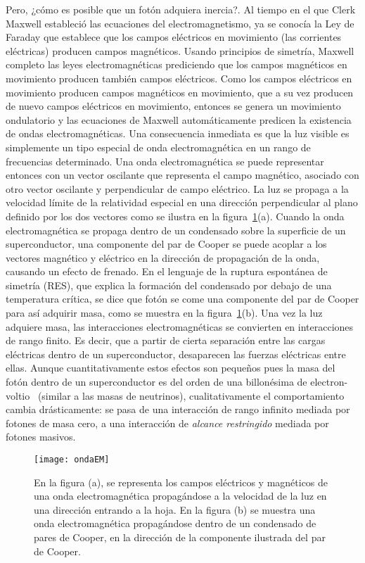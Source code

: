 Pero, ¿cómo es posible que un fotón adquiera inercia?. Al tiempo en el que Clerk Maxwell estableció las ecuaciones del electromagnetismo, ya se conocía la Ley de Faraday que establece que los campos eléctricos en movimiento (las corrientes eléctricas) producen campos magnéticos. Usando principios de simetría, Maxwell completo las leyes electromagnéticas prediciendo que los campos magnéticos en movimiento producen también campos eléctricos. Como los campos eléctricos en movimiento producen campos magnéticos en movimiento, que a su vez producen de nuevo campos eléctricos en movimiento, entonces se genera un movimiento ondulatorio y las ecuaciones de Maxwell automáticamente predicen la existencia de ondas electromagnéticas. Una consecuencia inmediata es que la luz visible es simplemente un tipo especial de onda electromagnética en un rango de frecuencias determinado. Una onda electromagnética se puede representar entonces con un vector oscilante que representa el campo magnético, asociado con otro vector oscilante y perpendicular de campo eléctrico. La luz se propaga a la velocidad límite de la relatividad especial en una dirección perpendicular al plano definido por los dos vectores como se ilustra en la figura~\ref{fig:2}(a). Cuando la onda electromagnética se propaga dentro de un condensado sobre la superficie de un superconductor, una componente del par de Cooper se puede acoplar a los vectores magnético y eléctrico en la dirección de propagación de la onda, causando un efecto de frenado. En el lenguaje de la ruptura espontánea de simetría (RES), que explica la formación del condensado por debajo de una temperatura crítica, se dice que fotón se come una componente del par de Cooper para así adquirir masa, como se muestra en la figura~\ref{fig:2}(b). Una vez la luz adquiere masa, las interacciones electromagnéticas se convierten en interacciones de rango finito. Es decir, que a partir de cierta separación entre las cargas eléctricas dentro de un superconductor, desaparecen las fuerzas eléctricas entre ellas. Aunque cuantitativamente estos efectos son pequeños pues la masa del fotón dentro de un superconductor es del orden de una billonésima de electron-voltio~\cite{beamline} (similar a las masas de neutrinos), cualitativamente el comportamiento cambia drásticamente: se pasa de una interacción de rango infinito mediada por fotones de masa cero, a una interacción de \emph{alcance restringido} mediada por fotones masivos. 

\begin{figure}
  \centering
  \texttt{[image: ondaEM]}
  \caption{En la figura (a), se representa los campos eléctricos y magnéticos de una onda electromagnética propagándose a la velocidad de la luz en una dirección entrando a la hoja. En  la figura (b) se muestra una onda electromagnética propagándose dentro de un condensado de pares de Cooper, en la dirección de la componente ilustrada del par de Cooper.}
  \label{fig:2}
\end{figure}


